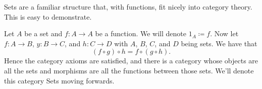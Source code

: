 Sets are a familiar structure that, with functions, fit nicely into
category theory. This is easy to demonstrate.

Let $A$ be a set and $f \colon A \to A$ be a function. We will denote $1_A
\coloneqq f$.  Now let $f \colon A \to B$, $y \colon B \to C$, and $h \colon C
\to D$ with $A$, $B$, $C$, and $D$ being sets. We have that
\[
\left( f \circ g \right) \circ h = f \circ \left( g \circ h \right) \textrm{.}
\]
Hence the category axioms are satisfied, and there is a category whose objects
are all the sets and morphisms are all the functions between those sets. We'll
denote this category Sets moving forwards.

